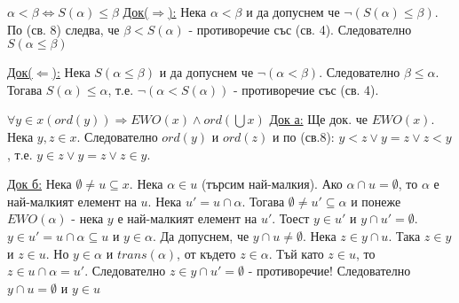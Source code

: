 \documentclass[fleqn, titlepage, 12pt]{report}
\begin{document}
 $ \alpha < \beta \Leftrightarrow S(\alpha) \leq \beta$
\bigbreak
\underline{Док($ \Rightarrow $):} Нека $ \alpha < \beta$ и да допуснем че $ \lnot (S(\alpha) \leq \beta) $. По (св. 8)
следва, че $ \beta < S(\alpha) $ - противоречие със (св. 4). Следователно $ S( \alpha \leq \beta) $
\bigbreak

\underline{Док($ \Leftarrow $):} Нека $ S(\alpha \leq \beta) $ и да допуснем че $ \lnot (\alpha < \beta) $.
Следователно $ \beta \leq \alpha $. Тогава $ S(\alpha) \leq \alpha $, т.е. $ \lnot (\alpha < S(\alpha)) $ - противоречие
със (св. 4).

\bigbreak

 $ \forall{y \in x}(ord(y)) \Rightarrow EWO(x) \land ord(\bigcup x)$
\bigbreak
\underline{Док а:} Ще док. че $ EWO(x) $. Нека $ y,z \in x $. Следователно $ ord(y) $ и $ ord(z) $ и по (св.8):
$ y < z \lor y = z \lor z < y $, т.е. $ y \in z \lor y = z \lor z \in y $.
\bigbreak

\underline{Док б:} Нека $ \emptyset \neq u \subseteq x $. Нека $ \alpha \in u $ (търсим най-малкия).
Ако $ \alpha \cap u = \emptyset $, то $ \alpha $ е най-малкият елемент на $ u $. Нека $ u' = u \cap \alpha $.
Тогава $ \emptyset \neq u' \subseteq \alpha $ и понеже $ EWO(\alpha) $ - нека $ y $ е най-малкият елемент на $ u' $.
Тоест $ y \in u' $ и $ y \cap u' = \emptyset $. $ y \in u' = u \cap \alpha \subseteq u $ и $ y \in \alpha $.
Да допуснем, че $ y \cap u \neq \emptyset $. Нека $ z \in y \cap u $. Така $ z \in y $ и $ z \in u $. Но $ y \in \alpha $
и $ trans(\alpha)$, от където $ z \in \alpha $. Тъй като $ z \in u $, то $ z \in u \cap \alpha = u' $.
Следователно $ z \in y \cap u' = \emptyset $ - противоречие! Следователно $ y \cap u = \emptyset $ и $ y \in u $
\end{document}
